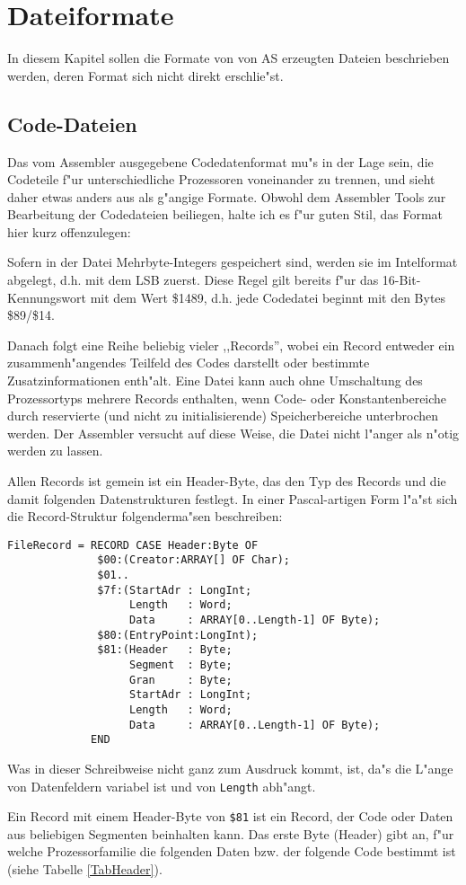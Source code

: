 \documentclass[12pt,a4paper,twoside]{report}
\begin{document}

\cleardoublepage
\chapter{Dateiformate}

In diesem Kapitel sollen die Formate von von AS erzeugten Dateien
beschrieben werden, deren Format sich nicht direkt erschlie"st.

\section{Code-Dateien}
\label{SectCodeFormat}

Das vom Assembler ausgegebene Codedatenformat mu"s in der Lage sein,
die Codeteile f"ur unterschiedliche Prozessoren voneinander zu trennen,
und sieht daher etwas anders aus als g"angige Formate.  Obwohl dem
Assembler Tools zur Bearbeitung der Codedateien beiliegen, halte ich es
f"ur guten Stil, das Format hier kurz offenzulegen:
\par
Sofern in der Datei Mehrbyte-Integers gespeichert sind, werden sie
im Intelformat abgelegt, d.h. mit dem LSB zuerst.  Diese Regel gilt
bereits f"ur das 16-Bit-Kennungswort mit dem Wert \$1489, d.h. jede
Codedatei beginnt mit den Bytes \$89/\$14.
\par
Danach folgt eine Reihe beliebig vieler ,,Records'', wobei ein Record
entweder ein zusammenh"angendes Teilfeld des Codes darstellt oder bestimmte
Zusatzinformationen enth"alt.  Eine Datei
kann auch ohne Umschaltung des Prozessortyps mehrere Records enthalten,
wenn Code- oder Konstantenbereiche durch reservierte (und nicht zu
initialisierende) Speicherbereiche unterbrochen werden.  Der Assembler
versucht auf diese Weise, die Datei nicht l"anger als n"otig werden
zu lassen.
\par
Allen Records ist gemein ist ein Header-Byte, das den Typ des Records
und die damit folgenden Datenstrukturen festlegt.  In einer Pascal-artigen
Form l"a"st sich die Record-Struktur folgenderma"sen beschreiben:
\begin{verbatim}
FileRecord = RECORD CASE Header:Byte OF
              $00:(Creator:ARRAY[] OF Char);
              $01..
              $7f:(StartAdr : LongInt;
                   Length   : Word;
                   Data     : ARRAY[0..Length-1] OF Byte);
              $80:(EntryPoint:LongInt);
              $81:(Header   : Byte;
                   Segment  : Byte;
                   Gran     : Byte;
                   StartAdr : LongInt;
                   Length   : Word;
                   Data     : ARRAY[0..Length-1] OF Byte);
             END
\end{verbatim}
Was in dieser Schreibweise nicht ganz zum Ausdruck kommt, ist, da"s
die L"ange von Datenfeldern variabel ist und von {\tt Length} abh"angt.
\par
Ein Record mit einem Header-Byte von \verb!$81! ist ein Record, der Code
oder Daten aus beliebigen Segmenten beinhalten kann.  Das erste
Byte (Header) gibt an, f"ur welche Prozessorfamilie die folgenden
Daten bzw. der folgende  Code bestimmt ist (siehe Tabelle \ref{TabHeader}).
\end{document}
